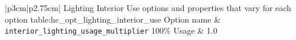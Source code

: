 \begin{customLongTable}{ |p{3cm}|p{2.75cm}| }
{Lighting Interior Use options and properties that vary for each option} {table:hc_opt_lighting_interior_use}
{Option name & \texttt{interior\_lighting\_usage\_multiplier}}
100\% Usage & 1.0 \\
\end{customLongTable}
